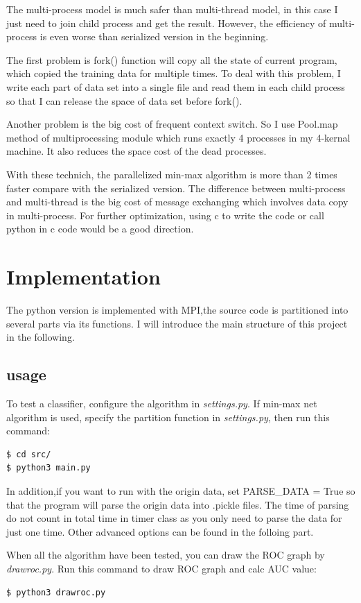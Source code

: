 \documentclass[11pt]{article}
\begin{document}
The multi-process model is much safer than multi-thread model, in this case I just need to
join child process and get the result. However, the efficiency of multi-process is even
worse than serialized version in the beginning.

The first problem is fork() function will copy all the state of current program, which
copied the training data for multiple times. To deal with this problem, I write each part
of data set into a single file and read them in each child process so that I can release
the space of data set before fork().

Another problem is the big cost of frequent context switch. So I use Pool.map method of
multiprocessing module which runs exactly 4 processes in my 4-kernal machine. It also
reduces the space cost of the dead processes.

With these technich, the parallelized min-max algorithm is more than 2 times faster
compare with the serialized version.
The difference between multi-process and multi-thread is the big cost of message exchanging
which involves data copy in multi-process. For further optimization, using c to write the code
or call python in c code would be a good direction.

\section{Implementation}
\label{sec-3}
The python version is implemented with MPI,the source code is partitioned into several
parts via its functions. I will introduce the main structure of this project in the following.

\subsection{usage}
\label{sec-3-1}
To test a classifier, configure the algorithm in \emph{settings.py}. If min-max net algorithm
is used, specify the partition function in \emph{settings.py}, then run this command:
\begin{verbatim}
$ cd src/
$ python3 main.py
\end{verbatim}
In addition,if you want to run with the origin data, set PARSE\_DATA = True so
that the program will parse the origin data into .pickle files. The time of
parsing do not count in total time in timer class as you only need to parse the
data for just one time. Other advanced options can be found in the folloing part.

When all the algorithm have been tested, you can draw the ROC graph by \emph{drawroc.py}.
Run this command to draw ROC graph and calc AUC value:
\begin{verbatim}
$ python3 drawroc.py
\end{verbatim}
\end{document}
